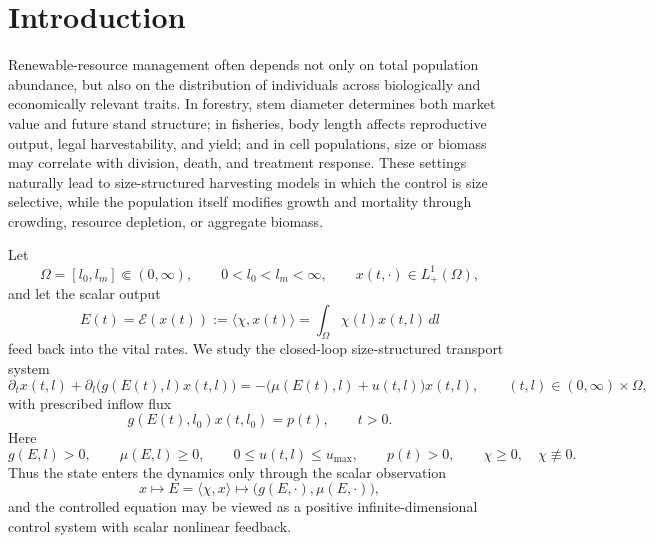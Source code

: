 \documentclass[a4paper,fleqn,longmktitle]{cas-sc}
\theoremstyle{plain}
\theoremstyle{definition}
\theoremstyle{remark}
\numberwithin{equation}{section}
\begin{document}
\maketitle


\section{Introduction}
\label{sec:introduction}

Renewable-resource management often depends not only on total population
abundance, but also on the distribution of individuals across biologically and
economically relevant traits. In forestry, stem diameter determines both
market value and future stand structure; in fisheries, body length affects
reproductive output, legal harvestability, and yield; and in cell populations,
size or biomass may correlate with division, death, and treatment response.
These settings naturally lead to size-structured harvesting models in which
the control is size selective, while the population itself modifies growth and
mortality through crowding, resource depletion, or aggregate biomass.

Let
\[
    \Omega=[l_0,l_m]\Subset(0,\infty),
    \qquad
    0<l_0<l_m<\infty,
    \qquad
    x(t,\cdot)\in L^1_+(\Omega),
\]
and let the scalar output
\[
    E(t)=\mathcal E(x(t))
    :=
    \langle\chi,x(t)\rangle
    =
    \int_\Omega \chi(l)x(t,l)\,dl
\]
feed back into the vital rates. We study the closed-loop size-structured
transport system
\begin{equation}
    \label{eq:intro_state}
    \partial_t x(t,l)
    +
    \partial_l\!\big(g(E(t),l)x(t,l)\big)
    =
    -\big(\mu(E(t),l)+u(t,l)\big)x(t,l),
    \qquad
    (t,l)\in(0,\infty)\times\Omega,
\end{equation}
with prescribed inflow flux
\begin{equation}
    \label{eq:intro_flux_bc}
    g(E(t),l_0)x(t,l_0)=p(t),
    \qquad
    t>0.
\end{equation}
Here
\[
    g(E,l)>0,
    \qquad
    \mu(E,l)\ge0,
    \qquad
    0\le u(t,l)\le u_{\max},
    \qquad
    p(t)>0,
    \qquad
    \chi\ge0,\quad \chi\not\equiv0.
\]
Thus the state enters the dynamics only through the scalar observation
\[
    x
    \longmapsto
    E=\langle\chi,x\rangle
    \longmapsto
    \big(g(E,\cdot),\mu(E,\cdot)\big),
\]
and the controlled equation may be viewed as a positive infinite-dimensional
control system with scalar nonlinear feedback.
\end{document}
